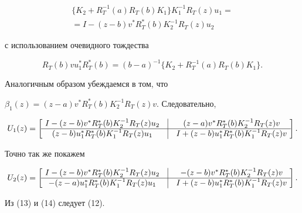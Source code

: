 \begin{pf}
\begin{multline*}
\{ K_2+R_T^{-1}(a)R_T(b)K_1 \}K_1^{-1}R_T(z)u_1= \\


%


=I-(z-b)v^{*}R_T^*(b)K_2^{-1}R_T(z)u_2


\end{multline*}


с использованием очевидного тождества


$$


R_T(b)vu_1^*R_T^*(b)=(b-a)^{-1} \{ K_2+R_T^{-1}(a)R_T(b)K_1 \}.


$$





Аналогичным образом убеждаемся в том, что


$\beta_1(z)=(z-a)v^*R_T^*(b)K_2^{-1}R_T(z)v$. Следовательно,


\begin{equation}


U_1(z)= \left[\ \begin{matrix}


I-(z-b)v^{*}R_T^*(b)K_2^{-1}R_T(z)u_2 & \vline &


(z-a)v^{*}R_T^*(b)K_2^{-1}R_T(z)v \\


\hline


(z-b)u_1^{*}R_T^*(b)K_1^{-1}R_T(z)u_1 & \vline &


I+(z-b)u_1^*R_T^*(b)K_1^{-1}R_T(z)v


\end{matrix}\ \right].


\end{equation}


Точно так же покажем


\begin{equation}


U_2(z)= \left[\ \begin{matrix}


I-(z-b)v^{*}R_T^*(b)K_2^{-1}R_T(z)u_2 & \vline &


-(z-b)v^{*}R_T^*(b)K_2^{-1}R_T(z)v \\


\hline


-(z-a)u_1^{*}R_T^*(b)K_1^{-1}R_T(z)u_1 & \vline &


I+(z-b)u_1^*R_T^*(b)K_1^{-1}R_T(z)v


\end{matrix}\ \right].


\end{equation}


Из (13) и (14) следует (12).


\end{pf}





